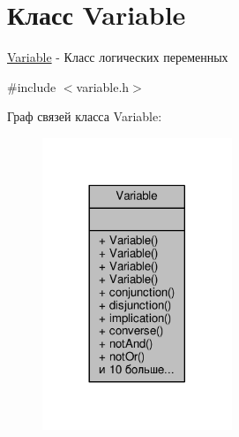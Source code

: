 \hypertarget{class_variable}{}\section{Класс Variable}
\label{class_variable}


\hyperlink{class_variable}{Variable} -\/ Класс логических переменных  




{\ttfamily \#include $<$variable.\+h$>$}



Граф связей класса Variable\+:\nopagebreak
\begin{figure}[H]
\begin{center}
\leavevmode
\includegraphics[width=161pt]{class_variable__coll__graph}
\end{center}
\end{figure}
